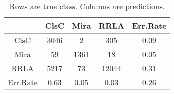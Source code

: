 \begin{table}[htb]
\begin{center}
\begin{tabular}{cccc|c}
  & ClsC & Mira & RRLA & Err.Rate \\ 
  \hline
ClsC & 3046 & 2 & 305 & 0.09 \\ 
  Mira & 59 & 1361 & 18 & 0.05 \\ 
  RRLA & 5217 & 73 & 12044 & 0.31 \\ 
   \hline
Err.Rate & 0.63 & 0.05 & 0.03 & 0.26 \\ 
  \end{tabular}
\caption{Rows are true class. Columns are predictions.}
\end{center}
\end{table}
